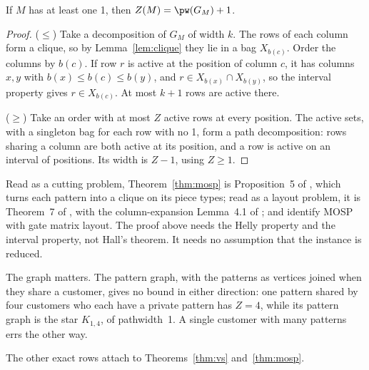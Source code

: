 \begin{theorem}\label{thm:mosp}
If $M$ has at least one 1, then $Z(M)=\pw(G_M)+1$.
\end{theorem}
\begin{proof}
($\le$) Take a decomposition of $G_M$ of width $k$. The rows of each column form
a clique, so by Lemma~\ref{lem:clique} they lie in a bag $X_{b(c)}$. Order the
columns by $b(c)$. If row $r$ is active at the position of column $c$, it has
columns $x,y$ with $b(x)\le b(c)\le b(y)$, and $r\in X_{b(x)}\cap X_{b(y)}$, so the
interval property gives $r\in X_{b(c)}$. At most $k+1$ rows are active there.

($\ge$) Take an order with at most $Z$ active rows at every position. The
active sets, with a singleton bag for each row with no 1, form a path
decomposition: rows sharing a column are both active at its position, and a row
is active on an interval of positions. Its width is $Z-1$, using $Z\ge1$.
\end{proof}

Read as a cutting problem, Theorem~\ref{thm:mosp} is Proposition~5 of
\citet{Yanasse1997a}, which turns each pattern into a clique on its piece types;
read as a layout problem, it is Theorem~7 of \citet{FellowsLangston1989}, with
the column-expansion Lemma~4.1 of \citet{FellowsLangston1987}; and
\citet[Prop.~2]{LY2002} identify MOSP with gate matrix layout. The proof above
needs the Helly property and the interval property, not Hall's theorem. It needs
no assumption that the instance is reduced.

The graph matters. The pattern graph, with the patterns as vertices joined when
they share a customer, gives no bound in either direction: one pattern shared by
four customers who each have a private pattern has $Z=4$, while its pattern
graph is the star $K_{1,4}$, of pathwidth~1. A single
customer with many patterns errs the other way.

The other exact rows attach to Theorems~\ref{thm:vs} and~\ref{thm:mosp}.

